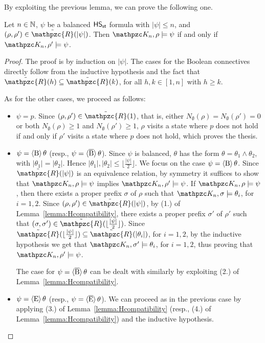 By exploiting the previous lemma, we can prove the following one.
 \begin{lemma}\label{corollary:HcompatibilityOne} Let $n\in\mathbb{N}$,  $\psi$ be a balanced $\text{\sffamily HS}_{\mathsf{st}}$ formula with $|\psi|\leq n$, and $(\rho,\rho')\in \tilde{\mathpzc{R}}(|\psi|)$. Then $\Ku_n,\rho\models \psi$ if and only if $\Ku_n,\rho'\models \psi$.
 \end{lemma}
 \begin{proof} The proof is by induction on $|\psi|$. The cases for the Boolean connectives directly follow from the inductive hypothesis and the fact that $\tilde{\mathpzc{R}}(h)\subseteq \tilde{\mathpzc{R}}(k)$, for all $h,k\in [1,n]$ with $h\geq k$. 
 
 As for the other cases, we proceed as follows:
 \begin{itemize}
  \item $\psi=p$. Since $(\rho,\rho')\in \tilde{\mathpzc{R}}(1)$, that is, either $N_{\emptyset}(\rho) = N_{\emptyset}(\rho') = 0$ or both
  $N_{\emptyset}(\rho) \geq 1$ and $N_{\emptyset}(\rho') \geq 1$, $\rho$ visits a state where $p$ does not hold if and only if $\rho'$ visits a state where $p$ does not hold, which proves the thesis.
  \item $\psi =\operatorname{\langle B\rangle} \theta$ (resp., $\psi =\operatorname{\langle \overline{B}\rangle} \theta$). Since $\psi$ is balanced, $\theta$ has the form $\theta=\theta_1\wedge\theta_2$, with $|\theta_1|=|\theta_2|$. Hence $|\theta_1|,|\theta_2|\leq \lfloor \frac{|\psi|}{2}\rfloor$. We focus on the case $\psi =\operatorname{\langle B\rangle} \theta$.
  Since $\tilde{\mathpzc{R}}(|\psi|)$ is an equivalence relation, by symmetry it suffices to show that $\Ku_n,\rho\models \psi$ implies $\Ku_n,\rho'\models \psi$. If $\Ku_n,\rho\models \psi$, then there exists a proper prefix $\sigma$ of $\rho$ such that $\Ku_n,\sigma\models \theta_i$, for $i=1,2$. Since $(\rho,\rho')\in \tilde{\mathpzc{R}}(|\psi|)$, by (1.) of Lemma~\ref{lemma:Hcompatibility}, there exists a proper prefix $\sigma'$ of $\rho'$ such that  $(\sigma,\sigma')\in \tilde{\mathpzc{R}}(\lfloor \frac{|\psi|}{2}\rfloor)$. Since $\tilde{\mathpzc{R}}(\lfloor \frac{|\psi|}{2}\rfloor)\subseteq \tilde{\mathpzc{R}}(|\theta_i|)$, for $i=1,2$, by the inductive hypothesis we get that $\Ku_n,\sigma'\models \theta_i$, for $i=1,2$, thus proving that $\Ku_n,\rho'\models \psi$.
      
  The case for $\psi =\operatorname{\langle \overline{B}\rangle} \theta$ can be dealt with similarly by exploiting (2.) of  Lemma~\ref{lemma:Hcompatibility}.
  \item $\psi =\operatorname{\langle E\rangle} \theta$ (resp., $\psi =\operatorname{\langle \overline{E}\rangle} \theta$). We can proceed as in the previous case by applying (3.) of Lemma~\ref{lemma:Hcompatibility} (resp., (4.) of Lemma~\ref{lemma:Hcompatibility}) and the inductive hypothesis.\qedhere
\end{itemize}
 \end{proof}
%

